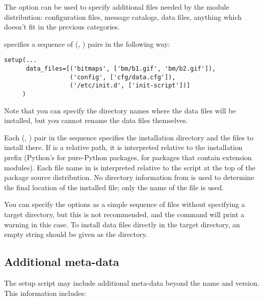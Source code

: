 \documentclass{howto}
\begin{document}
The  option can be used to specify additional
files needed by the module distribution: configuration files, message
catalogs, data files, anything which doesn't fit in the previous
categories.

 specifies a sequence of (,
) pairs in the following way:

\begin{verbatim}
setup(...
      data_files=[('bitmaps', ['bm/b1.gif', 'bm/b2.gif']),
                  ('config', ['cfg/data.cfg']),
                  ('/etc/init.d', ['init-script'])]
     )
\end{verbatim}

Note that you can specify the directory names where the data files
will be installed, but you cannot rename the data files themselves.

Each (, ) pair in the sequence specifies the
installation directory and the files to install there.  If
 is a relative path, it is interpreted relative to the
installation prefix (Python's  for pure-Python
packages,  for packages that contain extension
modules).  Each file name in  is interpreted relative to
the  script at the top of the package source
distribution.  No directory information from  is used to
determine the final location of the installed file; only the name of
the file is used.

You can specify the  options as a simple sequence
of files without specifying a target directory, but this is not recommended,
and the  command will print a warning in this case.
To install data files directly in the target directory, an empty
string should be given as the directory.

\subsection{Additional meta-data}
\label{meta-data}

The setup script may include additional meta-data beyond the name and
version. This information includes:
\end{document}
